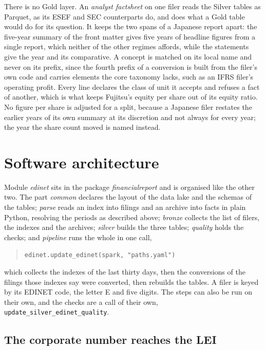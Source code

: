 There is no Gold layer. An \emph{analyst factsheet} on one filer reads the Silver tables as Parquet, as its ESEF and SEC counterparts do, and does what a Gold table would do for its question. It keeps the two spans of a Japanese report apart: the five-year summary of the front matter gives five years of headline figures from a single report, which neither of the other regimes affords, while the statements give the year and its comparative. A concept is matched on its local name and never on its prefix, since the fourth prefix of a conversion is built from the filer's own code and carries elements the core taxonomy lacks, such as an IFRS filer's operating profit. Every line declares the class of unit it accepts and refuses a fact of another, which is what keeps Fujitsu's equity per share out of its equity ratio. No figure per share is adjusted for a split, because a Japanese filer restates the earlier years of its own summary at its discretion and not always for every year; the year the share count moved is named instead.

\section{Software architecture}

Module \emph{edinet} sits in the package \emph{financialreport} and is organised like the other two. The part \emph{common} declares the layout of the data lake and the schemas of the tables; \emph{parse} reads an index into filings and an archive into facts in plain Python, resolving the periods as described above; \emph{bronze} collects the list of filers, the indexes and the archives; \emph{silver} builds the three tables; \emph{quality} holds the checks; and \emph{pipeline} runs the whole in one call,
\begin{quote}
\verb|edinet.update_edinet(spark, "paths.yaml")|
\end{quote}
which collects the indexes of the last thirty days, then the conversions of the filings those indexes say were converted, then rebuilds the tables. A filer is keyed by its EDINET code, the letter E and five digits. The steps can also be run on their own, and the checks are a call of their own, \verb|update_silver_edinet_quality|.

\subsection{The corporate number reaches the LEI}\label{sec:edinet-lei}


